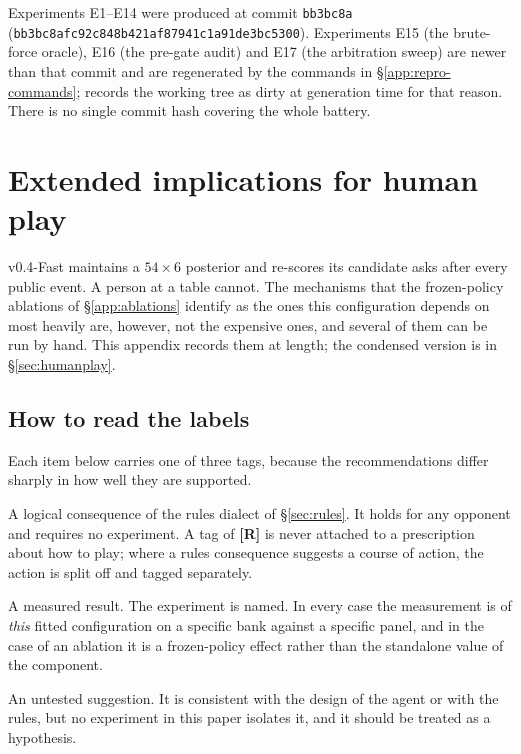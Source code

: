 \documentclass[11pt]{article}
\theoremstyle{definition}
\DeclareRobustCommand{\vfast}{\texorpdfstring{\mbox{v0.4-Fast}}{v0.4-Fast}}
\begin{document}
Experiments E1--E14 were produced at commit \texttt{bb3bc8a}
(\texttt{bb3bc8afc92c848b421af87941c1a91de3bc5300}). Experiments E15
(the brute-force oracle), E16 (the pre-gate audit) and E17 (the arbitration
sweep) are newer than that commit and are regenerated by the commands in
\S\ref{app:repro-commands};  records
the working tree as dirty at generation time for that reason. There is no single
commit hash covering the whole battery.
\section{Extended implications for human play}
\label{app:human}

\vfast{} maintains a $54 \times 6$ posterior and re-scores its candidate asks
after every public event. A person at a table cannot. The mechanisms that the
frozen-policy ablations of \S\ref{app:ablations} identify as the ones this
configuration depends on most heavily are, however, not the expensive ones, and
several of them can be run by hand. This appendix records them at length; the
condensed version is in \S\ref{sec:humanplay}.

\subsection{How to read the labels}
\label{app:human-labels}

Each item below carries one of three tags, because the recommendations differ
sharply in how well they are supported.

\begin{description}[leftmargin=2.2em,style=nextline]
\item[\textbf{[R]}] A logical consequence of the rules dialect of
\S\ref{sec:rules}. It holds for any opponent and requires no experiment. A tag
of \textbf{[R]} is never attached to a prescription about how to play; where a
rules consequence suggests a course of action, the action is split off and
tagged separately.
\item[\textbf{[M]}] A measured result. The experiment is named. In
every case the measurement is of \emph{this} fitted configuration on a specific
bank against a specific panel, and in the case of an ablation it is a
frozen-policy effect rather than the standalone value of the component.
\item[\textbf{[U]}] An untested suggestion. It is consistent with
the design of the agent or with the rules, but no experiment in this paper
isolates it, and it should be treated as a hypothesis.
\end{description}
\end{document}
